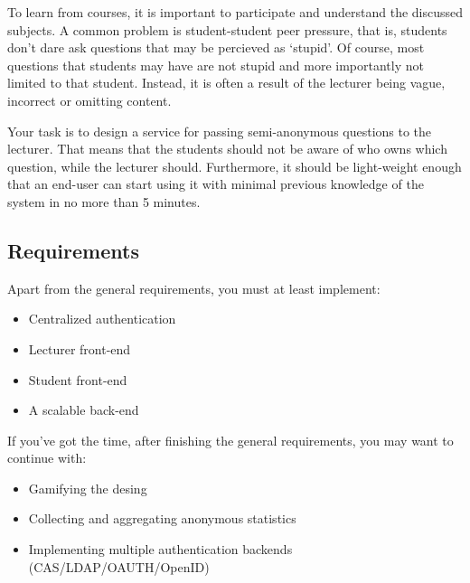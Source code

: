 To learn from courses, it is important to participate and understand the discussed subjects. A common problem is student-student peer pressure, that is, students don't dare ask questions that may be percieved as `stupid'. Of course, most questions that students may have are not stupid and more importantly not limited to that student. Instead, it is often a result of the lecturer being vague, incorrect or omitting content.

Your task is to design a service for passing semi-anonymous questions to the lecturer. That means that the students should not be aware of who owns which question, while the lecturer should. Furthermore, it should be light-weight enough that an end-user can start using it with minimal previous knowledge of the system in no more than 5 minutes.

\subsection*{Requirements}
Apart from the general requirements, you must at least implement:
\begin{itemize}
	\item Centralized authentication
	\item Lecturer front-end
	\item Student front-end
	\item A scalable back-end
\end{itemize}
If you've got the time, after finishing the general requirements, you may want to continue with:
\begin{itemize}
	\item Gamifying the desing
	\item Collecting and aggregating anonymous statistics
	\item Implementing multiple authentication backends (CAS/LDAP/OAUTH/OpenID)
\end{itemize}

